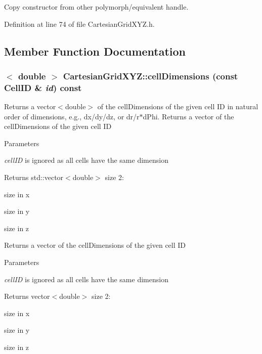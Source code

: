 Copy constructor from other polymorph/equivalent handle. 

Definition at line 74 of file CartesianGridXYZ.h.

\subsection{Member Function Documentation}
\hypertarget{class_d_d4hep_1_1_geometry_1_1_cartesian_grid_x_y_z_a97a650cec406e46aa9bdf2a8d745e9cb}{
\subsubsection[{cellDimensions}]{$<$ double $>$ CartesianGridXYZ::cellDimensions (const CellID \& {\em id}) const}}
\label{class_d_d4hep_1_1_geometry_1_1_cartesian_grid_x_y_z_a97a650cec406e46aa9bdf2a8d745e9cb}


Returns a vector$<$double$>$ of the cellDimensions of the given cell ID in natural order of dimensions, e.g., dx/dy/dz, or dr/r$\ast$dPhi. Returns a vector of the cellDimensions of the given cell ID 
\begin{DoxyParams}{Parameters}
\item[{\em cellID}]is ignored as all cells have the same dimension \end{DoxyParams}
\begin{DoxyReturn}{Returns}
std::vector$<$double$>$ size 2:
\begin{DoxyEnumerate}
\item size in x
\item size in y
\item size in z
\end{DoxyEnumerate}
\end{DoxyReturn}
Returns a vector of the cellDimensions of the given cell ID 
\begin{DoxyParams}{Parameters}
\item[{\em cellID}]is ignored as all cells have the same dimension \end{DoxyParams}
\begin{DoxyReturn}{Returns}
vector$<$double$>$ size 2:
\begin{DoxyEnumerate}
\item size in x
\item size in y
\item size in z 
\end{DoxyEnumerate}
\end{DoxyReturn}


